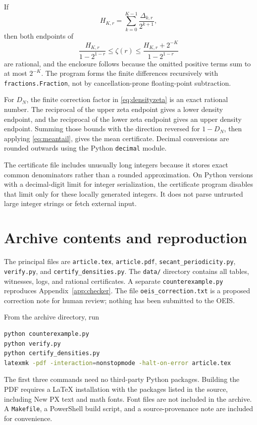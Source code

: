\documentclass[11pt,a4paper]{article}
\numberwithin{equation}{section}
\theoremstyle{definition}
\begin{document}
If
\[
H_{K,r}=\sum_{k=0}^{K-1}\frac{\Delta_{k,r}}{2^{k+1}},
\]
then both endpoints of
\begin{equation}\label{eq:zetacertificate}
\frac{H_{K,r}}{1-2^{1-r}}
\le\zeta(r)\le
\frac{H_{K,r}+2^{-K}}{1-2^{1-r}}
\end{equation}
are rational, and the enclosure follows because the omitted positive
terms sum to at most $2^{-K}$. The program forms the finite differences
recursively with \texttt{fractions.Fraction}, not by cancellation-prone
floating-point subtraction.

For $D_N$, the finite correction factor in \eqref{eq:densityzeta} is an
exact rational number. The reciprocal of the upper zeta endpoint gives
a lower density endpoint, and the reciprocal of the lower zeta endpoint
gives an upper density endpoint. Summing those bounds with the direction
reversed for $1-D_N$, then applying \eqref{eq:meantail}, gives the mean
certificate. Decimal conversions are rounded outwards using the Python
\texttt{decimal} module.

The certificate file includes unusually long integers because it stores
exact common denominators rather than a rounded approximation. On Python
versions with a decimal-digit limit for integer serialization, the
certificate program disables that limit only for these locally generated
integers. It does not parse untrusted large integer strings or fetch
external input.

\clearpage
\section{Archive contents and reproduction}
\label{app:archive}

The principal files are \texttt{article.tex}, \texttt{article.pdf},
\texttt{secant\_periodicity.py}, \texttt{verify.py}, and
\texttt{certify\_densities.py}. The \texttt{data/} directory contains
all tables, witnesses, logs, and rational certificates. A separate
\texttt{counterexample.py} reproduces Appendix~\ref{app:checker}.
The file \texttt{oeis\_correction.txt} is a proposed correction note for
human review; nothing has been submitted to the OEIS.

From the archive directory, run
\begin{lstlisting}[language=bash]
python counterexample.py
python verify.py
python certify_densities.py
latexmk -pdf -interaction=nonstopmode -halt-on-error article.tex
\end{lstlisting}
The first three commands need no third-party Python packages. Building
the PDF requires a LaTeX installation with the packages listed in the
source, including New PX text and math fonts. Font files are not included
in the archive. A \texttt{Makefile}, a PowerShell build script, and a
source-provenance note are included for convenience.
\end{document}
